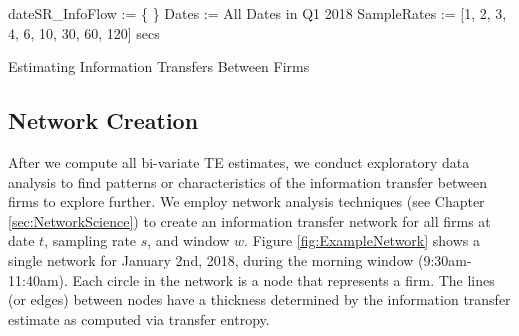 \begin{algorithm}[H]

\SetAlgoLined

dateSR\_InfoFlow := \{ \} \;
Dates := All Dates in Q1 2018 \;
SampleRates := [1, 2, 3, 4,  6, 10, 30, 60, 120] secs \;


\caption{Estimating Information Transfers Between Firms}
\label{alg:EstIF}
\end{algorithm}


\subsection{Network Creation}

After we compute all bi-variate TE estimates, we conduct exploratory data analysis to find patterns or characteristics of the information transfer between firms to explore further.   We employ network analysis techniques (see Chapter \ref{sec:NetworkScience}) to create an information transfer network for all firms at date $t$, sampling rate $s$, and window $w$.  Figure \ref{fig:ExampleNetwork} shows a single network for January 2nd,  2018, during the morning window (9:30am-11:40am).  Each circle in the network is a node that represents a firm. The lines (or edges) between nodes have a thickness determined by the information transfer estimate as computed via transfer entropy. 

